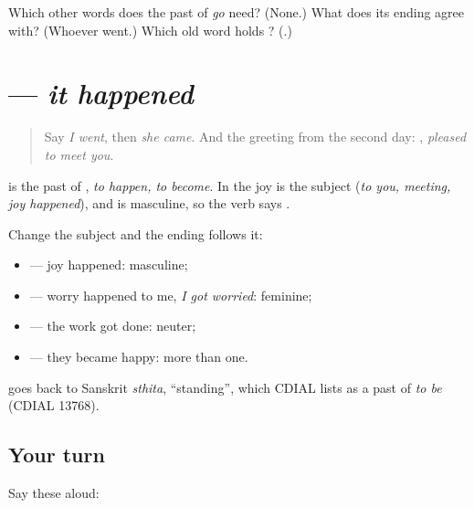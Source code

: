 \begin{tcolorbox}[breakable,colback=teal!4,colframe=teal!35!black,title={Before you move on}]
Which other words does the past of \emph{go} need? (None.) What does its ending agree with? (Whoever went.) Which old word holds \textbf{}? (\textbf{}.)
\end{tcolorbox}
\section[\texorpdfstring{\gu{થયો} · \gu{થઈ} · \gu{થયું} … (thayo · thaī …)}{થયો · થઈ · થયું … (thayo · thaī …)}]{ — \emph{it happened}}

\label{lesson:GU-C147-thayo}



\begin{quote}
Say \emph{I went}, then \emph{she came}. And the greeting from the second day: \textbf{   }, \emph{pleased to meet you}.
\end{quote}

\begin{grammarlens}[title={Grammar Lens: the past that was there from the start}]
\textbf{} is the past of \textbf{}, \emph{to happen, to become}. In \textbf{   } the joy is the subject (\emph{to you, meeting, joy happened}), and \textbf{} is masculine, so the verb says \textbf{}.

Change the subject and the ending follows it:

\begin{itemize}
\raggedright
  \item \textbf{ } — joy happened: masculine;
  \item \textbf{  } — worry happened to me, \emph{I got worried}: feminine;
  \item \textbf{ } — the work got done: neuter;
  \item \textbf{  } — they became happy: more than one.
\end{itemize}

\textbf{} goes back to Sanskrit \emph{sthita}, \textquotedblleft{}standing\textquotedblright{}, which CDIAL lists as a past of \emph{to be} (CDIAL 13768).
\end{grammarlens}

\subsection*{Your turn}
Say these aloud:

